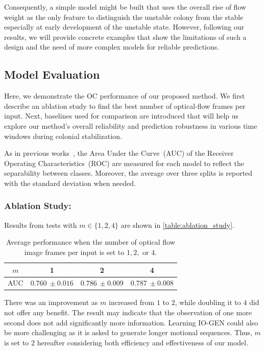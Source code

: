 \documentclass[letterpaper]{article} %
\let\orgautoref\autoref
\renewcommand{\autoref}
{\def\equationautorefname{Equation}%
\def\figureautorefname{Fig.}%
\def\subfigureautorefname{Fig.}%
\def\Itemautorefname{item}%
\def\tableautorefname{Table}%
\def\exerciseautorefname{Exercise}%
\def\starexerciseautorefname{Exercise}%
\def\sectionautorefname{Section}%
\def\subsectionautorefname{Section}%
\def\subsubsectionautorefname{Section}%
\def\chapterautorefname{Section}%
\def\partautorefname{Part}%
\orgautoref}
\begin{document}
Consequently, a simple model might be built that uses the overall rise
of flow weight as the only feature to distinguish the unstable colony
from the stable especially at early development of the unstable state.
However, following our results, we will provide concrete examples that
show the limitations of such a design and the need of more complex
models for reliable predictions.

\subsection{Model Evaluation}
\label{sec:model_evaluation}

Here, we demonstrate the OC performance of our proposed method. We first
describe an ablation study to find the best number of optical-flow
frames per input. Next, baselines used for comparison are introduced
that will help us explore our method's overall reliability and
prediction robustness in various time windows during colonial
stabilization.

As in previous works~\citep{RVGDSBMK18}, the Area Under the Curve~(AUC)
of the Receiver Operating Characteristics~(ROC) are measured for
each model to reflect the separability between classes. Moreover,
the average over three splits is reported with the standard
deviation when needed.

\subsubsection{Ablation Study:}
\label{sec:ablation_study}
Results from tests with $m \in \{1, 2, 4\}$ are shown in
\autoref{table:ablation_study}.
\setlength{\tabcolsep}{0.5em} %
{\renewcommand{\arraystretch}{1.2}%
\begin{table}
\centering
\begin{tabular}{|c|c|c|c|}
\hline
$m$  &  1 & 2 & 4  \\ \hline\hline
AUC & $0.760~\pm 0.016$ & $0.786~\pm 0.009$ & $0.787~\pm 0.008$
\\ \hline
\end{tabular}
\caption{Average performance when the number of optical flow
image frames per input is set to $1, 2,$ or $4$.}
\label{table:ablation_study}
\end{table}
}%
There was an improvement as $m$ increased from $1$ to $2$,
while doubling it to $4$ did not offer any benefit. The result may
indicate that the observation of one more second does not add
significantly more information. Learning \mbox{IO-GEN} could also be more
challenging as it is asked to generate longer motional sequences.  Thus,
$m$ is set to $2$ hereafter considering both efficiency and
effectiveness of our model.
\end{document}
